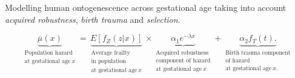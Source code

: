 \documentclass{beamer}
\begin{document}
\begin{frame}
\frametitle{\insertsection}

Modelling human ontogenescence across gestational age taking into account \emph{acquired robustness}, \emph{birth trauma} and \emph{selection}.

\begin{equation*}
  \underbrace{
    \overline{\mu}(x)
  }_{\substack{
    \text{Population hazard}\\ \text{at gestational age}~x
  }} =
  \underbrace{
    E[f_Z(z|x)]
  }_{\substack{
    \text{Average frailty}\\ \text{in population}\\ \text{at gestational age}~x
  }} \times
  \underbrace{
    \alpha_1 e^{-\lambda x}
  }_{\substack{
    \text{Acquired robustness}\\ \text{component of hazard}\\ \text{at gestational age}~x
  }} +
  \underbrace{
    \alpha_2 f_T(t).
  }_{\substack{
    \text{Birth trauma component}\\ \text{of hazard}\\ \text{at gestational age}~x.
  }}
\end{equation*}

\end{frame}

\end{document}
